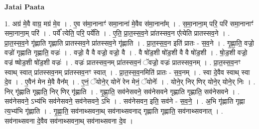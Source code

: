 \documentclass[17pt]{extarticle}
\begin{document}
\textbf{Jatai Paata} \newline

1. अग्र॑ मे॒वै वाग्र॒ मग्र॑ मे॒व । . ए॒व स॑मा॒नानाꣳ॑ समा॒नाना॑ मे॒वैव स॑मा॒नाना᳚म् । . स॒मा॒नाना॒म् परि॒ परि॑ समा॒नानाꣳ॑ समा॒नाना॒म् परि॑ । . पर्ये᳚ त्येति॒ परि॒ पर्ये॑ति । . ए॒ति॒ प्रा॒त॒स्स॒व॒ने प्रा॑तस्सव॒न ए᳚त्येति प्रातस्सव॒ने । . प्रा॒त॒स्स॒व॒ने गृ॑ह्णाति गृह्णाति प्रातस्सव॒ने प्रा॑तस्सव॒ने गृ॑ह्णाति । . प्रा॒त॒स्स॒व॒न इति॑ प्रातः - स॒व॒ने । . गृ॒ह्णा॒ति॒ वज्रो॒ वज्रो॑ गृह्णाति गृह्णाति॒ वज्रः॑ । . वज्रो॒ वै वै वज्रो॒ वज्रो॒ वै । . वै षो॑ड॒शी षो॑ड॒शी वै वै षो॑ड॒शी । . षो॒ड॒शी वज्रो॒ वज्र॑ ष्षोड॒शी षो॑ड॒शी वज्रः॑ । . वज्रः॑ प्रातस्सव॒नम् प्रा॑तस्सव॒नं ॅवज्रो॒ वज्रः॑ प्रातस्सव॒नम् । . प्रा॒त॒स्स॒व॒नꣳ स्वाथ् स्वात् प्रा॑तस्सव॒नम् प्रा॑तस्सव॒नꣳ स्वात् । . प्रा॒त॒स्स॒व॒नमिति॑ प्रातः - स॒व॒नम् । . स्वा दे॒वैव स्वाथ् स्वा दे॒व । . ए॒वैन॑ मेन मे॒वै वैन᳚म् । . ए॒नं॒ ॅयोने॒र् योने॑ रेन मेनं॒ ॅयोनेः᳚ । . योने॒र् निर् णिर् योने॒र् योने॒र् निः । . निर् गृ॑ह्णाति गृह्णाति॒ निर् णिर् गृ॑ह्णाति । . गृ॒ह्णा॒ति॒ सव॑नेसवने॒ सव॑नेसवने गृह्णाति गृह्णाति॒ सव॑नेसवने । . सव॑नेसवने॒ ऽभ्य॑भि सव॑नेसवने॒ सव॑नेसवने॒ ऽभि । . सव॑नेसवन॒ इति॒ सव॑ने - स॒व॒ने॒ । . अ॒भि गृ॑ह्णाति गृह्णा त्य॒भ्य॑भि गृ॑ह्णाति । . गृ॒ह्णा॒ति॒ सव॑नाथ्सवना॒थ् सव॑नाथ्सवनाद् गृह्णाति गृह्णाति॒ सव॑नाथ्सवनात् । . सव॑नाथ्सवना दे॒वैव सव॑नाथ्सवना॒थ् सव॑नाथ्सवना दे॒व । \newline
\end{document}
